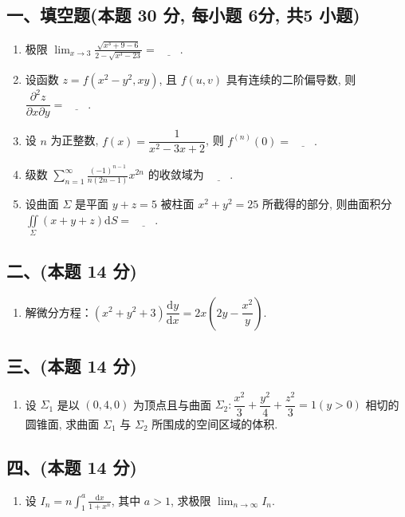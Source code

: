 \subsection*{一、填空题(本题 30 分,  每小题 6分,  共5 小题)}
\begin{enumerate}
    \item 极限 $\displaystyle \lim_{x \to 3} \frac{\sqrt{x^3 + 9 - 6}}{2 - \sqrt{x^3 - 23}} = \underline{\quad\quad} .$
    \item 设函数 $z = f(x^2 - y^2, xy)$, 且 $f(u, v)$ 具有连续的二阶偏导数, 则 $ \dfrac{\partial^2 z}{\partial x \partial y} = \underline{\quad\quad} .$
    \item 设 $n$ 为正整数, $f(x) = \dfrac{1}{x^2 - 3x + 2}$, 则 $f^{(n)}(0) = \underline{\quad\quad}. $
    \item 级数 $\displaystyle \sum_{n=1}^{\infty} \frac{(-1)^{n-1}}{n(2n-1)} x^{2n} $ 的收敛域为 $\underline{\quad\quad}.$
    \item 设曲面 $\Sigma$ 是平面 $y + z = 5$ 被柱面 $x^2 + y^2 = 25$ 所截得的部分, 则曲面积分 $ \displaystyle\iint\limits_{\Sigma} (x + y + z) \mathrm{d}S = \underline{\quad\quad}. $
\end{enumerate}

\subsection*{二、(本题 14 分)}
\begin{enumerate}[start=6]
    \item 解微分方程：$(x^2 + y^2 + 3) \dfrac{\mathrm{d}y}{\mathrm{d}x} = 2x \left( 2y - \dfrac{x^2}{y} \right)$.
\end{enumerate}

\subsection*{三、(本题 14 分)}
\begin{enumerate}[start=7]
    \item 设 $\Sigma_1$ 是以 $(0,4,0)$ 为顶点且与曲面 $\Sigma_2 : \dfrac{x^2}{3} + \dfrac{y^2}{4} + \dfrac{z^2}{3} = 1 (y > 0)$ 相切的圆锥面, 求曲面 $\Sigma_1$ 与 $\Sigma_2$ 所围成的空间区域的体积.
\end{enumerate}

\subsection*{四、(本题 14 分)}
\begin{enumerate}[start=8]
    \item 设 $I_n = n \displaystyle\int_{1}^{a} \frac{\mathrm{d}x}{1 + x^n}$, 其中 $a > 1$, 求极限 $\displaystyle\lim_{n \to \infty} I_n$.
\end{enumerate}


